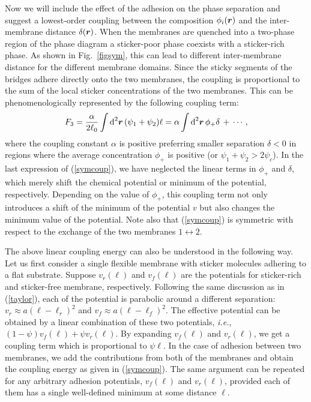 Now we will include the effect of the adhesion on the phase
separation and suggest a lowest-order coupling between the
composition $\phi_i(\mbox{\boldmath $r$})$ and the inter-membrane
distance $\delta(\mbox{\boldmath $r$})$. When the membranes are
quenched into a two-phase region of the phase diagram a
sticker-poor phase coexists with a sticker-rich phase. As shown in
Fig.\ \ref{figsym}, this can lead to different inter-membrane
distance for the different membrane domains. Since the sticky
segments of the bridges adhere directly onto the two membranes,
the coupling is proportional to the sum of the local sticker
concentrations of the two membranes. This can be
phenomenologically represented by the following coupling term:
\begin{equation}
F_3 = \frac{\alpha}{2\ell_0} \int \mbox{d}^2 \mbox{\boldmath $r$}
\, (\psi_1+\psi_2) \ell =\alpha \int \mbox{d}^2 \mbox{\boldmath
$r$} \, \phi_+ \delta \, + \, \cdots, \label{symcoup}
\end{equation}
where the coupling constant $\alpha$ is positive preferring smaller
separation $\delta<0$ in regions where the average concentration
$\phi_+$ is positive (or $\psi_1+\psi_2 >2 \psi_c$).
In the last expression of (\ref{symcoup}), we have neglected the linear
terms in $\phi_+$ and
$\delta$, which merely shift the chemical potential or minimum of the
potential, respectively.
Depending on the value of $\phi_+$, this coupling term not only
introduces a shift of the minimum of the potential $v$ but
also changes the minimum value of the potential.
Note also that (\ref{symcoup}) is symmetric with respect to the
exchange of the two membranes $1 \leftrightarrow 2$.


The above linear coupling energy can also be understood in the
following way. Let us first consider a single flexible membrane
with sticker molecules adhering to a flat substrate. Suppose
$v_r(\ell)$ and $v_f(\ell)$ are the potentials for sticker-rich
and sticker-free membrane, respectively. Following the same
discussion as in (\ref{taylor}), each of the potential is
parabolic around a different separation: $v_r \approx
a(\ell-\ell_r)^2$ and $v_f \approx a(\ell-\ell_f)^2$. The
effective potential can be obtained by a linear combination of
these two potentials, {\it i.e.}, $(1-\psi) v_f(\ell)+\psi
v_r(\ell)$. By expanding $v_f(\ell)$ and $v_r(\ell)$, we get a
coupling term which is proportional to $\psi \ell$. In the case of
adhesion between two membranes, we add the contributions from both
of the membranes and obtain the coupling energy as given in
(\ref{symcoup}). The same argument can be repeated for any
arbitrary adhesion potentials, $v_f(\ell)$ and $v_r(\ell)$,
provided each of them has a single well-defined minimum at some
distance $\ell$.


